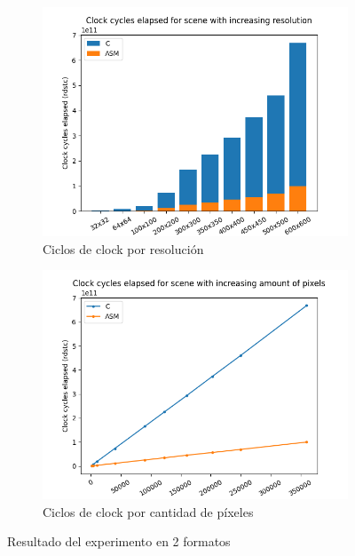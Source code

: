 \begin{figure}[H]
  \centering
  \begin{subfigure}[b]{0.45\textwidth}
    \centering
    \includegraphics[width=\textwidth]{./imgs/exp2-res-bar.png}
    \caption{Ciclos de clock por resolución}
    \label{fig:exp2-res-bar}
  \end{subfigure}
  \hfill
  \begin{subfigure}[b]{0.45\textwidth}
    \centering
    \includegraphics[width=\textwidth]{./imgs/exp2-res-line.png}
    \caption{Ciclos de clock por cantidad de píxeles}
    \label{fig:exp2-res-line}
  \end{subfigure}
  \caption{Resultado del experimento en 2 formatos}
  \label{fig:exp2-res}
\end{figure}

